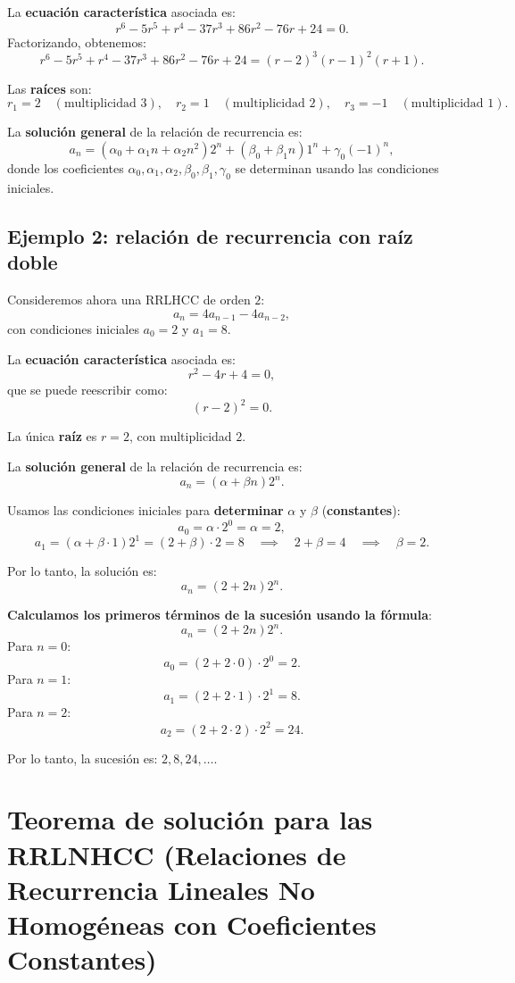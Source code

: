 \documentclass{article}
\begin{document}
La \textbf{ecuación característica} asociada es:
\[
r^6 - 5r^5 + r^4 - 37r^3 + 86r^2 - 76r + 24 = 0.
\]
Factorizando, obtenemos:
\[
r^6 - 5r^5 + r^4 - 37r^3 + 86r^2 - 76r + 24 = (r-2)^3(r-1)^2(r+1).
\]

Las \textbf{raíces} son:
\[
r_1 = 2 \quad (\text{multiplicidad } 3), \quad r_2 = 1 \quad (\text{multiplicidad } 2), \quad r_3 = -1 \quad (\text{multiplicidad } 1).
\]

La \textbf{solución general} de la relación de recurrencia es:
\[
a_n = (\alpha_0 + \alpha_1 n + \alpha_2 n^2) 2^n + (\beta_0 + \beta_1 n) 1^n + \gamma_0 (-1)^n,
\]
donde los coeficientes $\alpha_0, \alpha_1, \alpha_2, \beta_0, \beta_1, \gamma_0$ se determinan usando las condiciones iniciales.

\newpage

\subsection{Ejemplo 2: relación de recurrencia con raíz doble}
Consideremos ahora una RRLHCC de orden $2$:
\[
a_n = 4a_{n-1} - 4a_{n-2},
\]
con condiciones iniciales $a_0 = 2$ y $a_1 = 8$.

La \textbf{ecuación característica} asociada es:
\[
r^2 - 4r + 4 = 0,
\]
que se puede reescribir como:
\[
(r-2)^2 = 0.
\]

La única \textbf{raíz} es $r = 2$, con multiplicidad $2$.

La \textbf{solución general} de la relación de recurrencia es:
\[
a_n = (\alpha + \beta n) 2^n.
\]

Usamos las condiciones iniciales para \textbf{determinar} $\alpha$ y $\beta$ (\textbf{constantes}):
\[
a_0 = \alpha \cdot 2^0 = \alpha = 2,
\]
\[
a_1 = (\alpha + \beta \cdot 1) 2^1 = (2 + \beta) \cdot 2 = 8 \quad \implies \quad 2 + \beta = 4 \quad \implies \quad \beta = 2.
\]

Por lo tanto, la solución es:
\[
a_n = (2 + 2n) 2^n.
\]

\textbf{Calculamos los primeros términos de la sucesión usando la fórmula}:
\[
a_n = (2 + 2n) 2^n.
\]
Para $n = 0$:
\[
a_0 = (2 + 2 \cdot 0) \cdot 2^0 = 2.
\]
Para $n = 1$:
\[
a_1 = (2 + 2 \cdot 1) \cdot 2^1 = 8.
\]
Para $n = 2$:
\[
a_2 = (2 + 2 \cdot 2) \cdot 2^2 = 24.
\]

Por lo tanto, la sucesión es: $2, 8, 24, \dots$.

\newpage

\section{Teorema de solución para las RRLNHCC (Relaciones de Recurrencia Lineales No Homogéneas con Coeficientes Constantes)}
\end{document}
